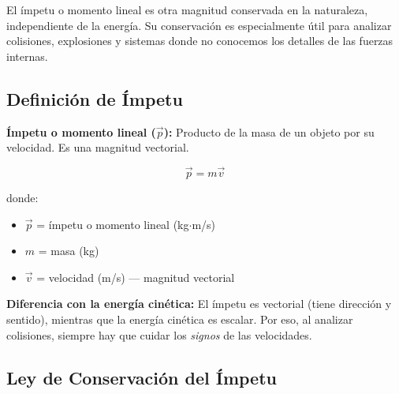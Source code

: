 \begin{seccion}
El ímpetu o momento lineal es otra magnitud conservada en la naturaleza, independiente de la energía. Su conservación es especialmente útil para analizar colisiones, explosiones y sistemas donde no conocemos los detalles de las fuerzas internas.
\end{seccion}

\subsection{Definición de Ímpetu}

\begin{seccion}
\begin{definicion}
    \textbf{Ímpetu o momento lineal ($\vec{p}$):} Producto de la masa de un objeto por su velocidad. Es una magnitud vectorial.
\end{definicion}

\begin{ecuacion}
$$\vec{p} = m\vec{v}$$

donde:
\begin{itemize}
    \item $\vec{p}$ = ímpetu o momento lineal (kg$\cdot$m/s)
    \item $m$ = masa (kg)
    \item $\vec{v}$ = velocidad (m/s) — magnitud vectorial
\end{itemize}
\end{ecuacion}

\begin{nota}
    \textbf{Diferencia con la energía cinética:} El ímpetu es vectorial (tiene dirección y sentido), mientras que la energía cinética es escalar. Por eso, al analizar colisiones, siempre hay que cuidar los \textit{signos} de las velocidades.
\end{nota}
\end{seccion}

\subsection{Ley de Conservación del Ímpetu}

